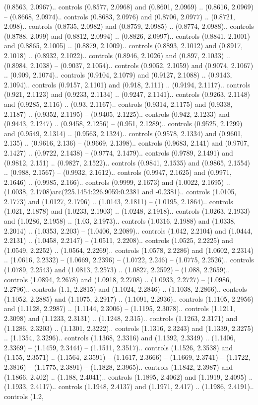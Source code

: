 (0.8563, 2.0967).. controls (0.8577, 2.0968) and (0.8601, 2.0969) .. (0.8616, 2.0969) -- (0.8668, 2.0974).. controls (0.8683, 2.0976) and (0.8706, 2.0977) .. (0.8721, 2.098).. controls (0.8735, 2.0982) and (0.8759, 2.0985) .. (0.8774, 2.0988).. controls (0.8788, 2.099) and (0.8812, 2.0994) .. (0.8826, 2.0997).. controls (0.8841, 2.1001) and (0.8865, 2.1005) .. (0.8879, 2.1009).. controls (0.8893, 2.1012) and (0.8917, 2.1018) .. (0.8932, 2.1022).. controls (0.8946, 2.1026) and (0.897, 2.1033) .. (0.8984, 2.1038) -- (0.9037, 2.1054).. controls (0.9052, 2.1059) and (0.9074, 2.1067) .. (0.909, 2.1074).. controls (0.9104, 2.1079) and (0.9127, 2.1088) .. (0.9143, 2.1094).. controls (0.9157, 2.1101) and (0.918, 2.111) .. (0.9194, 2.1117).. controls (0.921, 2.1123) and (0.9233, 2.1134) .. (0.9247, 2.1141).. controls (0.9263, 2.1148) and (0.9285, 2.116) .. (0.93, 2.1167).. controls (0.9314, 2.1175) and (0.9338, 2.1187) .. (0.9352, 2.1195) -- (0.9405, 2.1225).. controls (0.942, 2.1233) and (0.9443, 2.1247) .. (0.9458, 2.1256) -- (0.951, 2.1289).. controls (0.9525, 2.1299) and (0.9549, 2.1314) .. (0.9563, 2.1324).. controls (0.9578, 2.1334) and (0.9601, 2.135) .. (0.9616, 2.136) -- (0.9669, 2.1398).. controls (0.9683, 2.141) and (0.9707, 2.1427) .. (0.9722, 2.1438) -- (0.9774, 2.1479).. controls (0.9789, 2.1491) and (0.9812, 2.151) .. (0.9827, 2.1522).. controls (0.9841, 2.1535) and (0.9865, 2.1554) .. (0.988, 2.1567) -- (0.9932, 2.1612).. controls (0.9947, 2.1625) and (0.9971, 2.1646) .. (0.9985, 2.166).. controls (0.9999, 2.1673) and (1.0022, 2.1695) .. (1.0038, 2.1708)arc(225.1454:226.9059:0.2381 and -0.2381).. controls (1.0105, 2.1773) and (1.0127, 2.1796) .. (1.0143, 2.1811) -- (1.0195, 2.1864).. controls (1.021, 2.1878) and (1.0233, 2.1903) .. (1.0248, 2.1918).. controls (1.0263, 2.1933) and (1.0286, 2.1958) .. (1.03, 2.1973).. controls (1.0316, 2.1988) and (1.0338, 2.2014) .. (1.0353, 2.203) -- (1.0406, 2.2089).. controls (1.042, 2.2104) and (1.0444, 2.2131) .. (1.0458, 2.2147) -- (1.0511, 2.2208).. controls (1.0525, 2.2225) and (1.0549, 2.2252) .. (1.0564, 2.2269).. controls (1.0578, 2.2286) and (1.0602, 2.2314) .. (1.0616, 2.2332) -- (1.0669, 2.2396) -- (1.0722, 2.246) -- (1.0775, 2.2526).. controls (1.0789, 2.2543) and (1.0813, 2.2573) .. (1.0827, 2.2592) -- (1.088, 2.2659).. controls (1.0894, 2.2678) and (1.0918, 2.2708) .. (1.0933, 2.2727) -- (1.0986, 2.2796).. controls (1.1, 2.2815) and (1.1024, 2.2846) .. (1.1038, 2.2866).. controls (1.1052, 2.2885) and (1.1075, 2.2917) .. (1.1091, 2.2936).. controls (1.1105, 2.2956) and (1.1128, 2.2987) .. (1.1144, 2.3006) -- (1.1195, 2.3078).. controls (1.1211, 2.3098) and (1.1233, 2.3131) .. (1.1248, 2.315).. controls (1.1263, 2.3171) and (1.1286, 2.3203) .. (1.1301, 2.3222).. controls (1.1316, 2.3243) and (1.1339, 2.3275) .. (1.1354, 2.3296).. controls (1.1368, 2.3316) and (1.1392, 2.3349) .. (1.1406, 2.3369) -- (1.1459, 2.3444) -- (1.1511, 2.3517).. controls (1.1526, 2.3538) and (1.155, 2.3571) .. (1.1564, 2.3591) -- (1.1617, 2.3666) -- (1.1669, 2.3741) -- (1.1722, 2.3816) -- (1.1775, 2.3891) -- (1.1828, 2.3965).. controls (1.1842, 2.3987) and (1.1866, 2.402) .. (1.188, 2.4041).. controls (1.1895, 2.4062) and (1.1919, 2.4095) .. (1.1933, 2.4117).. controls (1.1948, 2.4137) and (1.1971, 2.417) .. (1.1986, 2.4191).. controls (1.2, 
